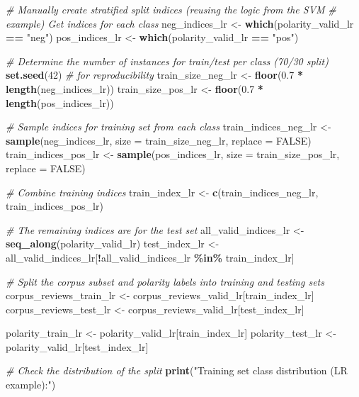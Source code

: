 \documentclass[
]{book}
\newenvironment{Shaded}{\begin{snugshade}}{\end{snugshade}}
\newcommand{\AttributeTok}[1]{\textcolor[rgb]{0.13,0.29,0.53}{#1}}
\newcommand{\CommentTok}[1]{\textcolor[rgb]{0.56,0.35,0.01}{\textit{#1}}}
\newcommand{\ConstantTok}[1]{\textcolor[rgb]{0.56,0.35,0.01}{#1}}
\newcommand{\DecValTok}[1]{\textcolor[rgb]{0.00,0.00,0.81}{#1}}
\newcommand{\FloatTok}[1]{\textcolor[rgb]{0.00,0.00,0.81}{#1}}
\newcommand{\FunctionTok}[1]{\textcolor[rgb]{0.13,0.29,0.53}{\textbf{#1}}}
\newcommand{\NormalTok}[1]{#1}
\newcommand{\OtherTok}[1]{\textcolor[rgb]{0.56,0.35,0.01}{#1}}
\newcommand{\SpecialCharTok}[1]{\textcolor[rgb]{0.81,0.36,0.00}{\textbf{#1}}}
\newcommand{\StringTok}[1]{\textcolor[rgb]{0.31,0.60,0.02}{#1}}
\begin{document}
\begin{Shaded}
\begin{Highlighting}[]
\CommentTok{\# Manually create stratified split indices (reusing the logic from the SVM}
\CommentTok{\# example) Get indices for each class}
\NormalTok{neg\_indices\_lr }\OtherTok{\textless{}{-}} \FunctionTok{which}\NormalTok{(polarity\_valid\_lr }\SpecialCharTok{==} \StringTok{"neg"}\NormalTok{)}
\NormalTok{pos\_indices\_lr }\OtherTok{\textless{}{-}} \FunctionTok{which}\NormalTok{(polarity\_valid\_lr }\SpecialCharTok{==} \StringTok{"pos"}\NormalTok{)}

\CommentTok{\# Determine the number of instances for train/test per class (70/30 split)}
\FunctionTok{set.seed}\NormalTok{(}\DecValTok{42}\NormalTok{)  }\CommentTok{\# for reproducibility}
\NormalTok{train\_size\_neg\_lr }\OtherTok{\textless{}{-}} \FunctionTok{floor}\NormalTok{(}\FloatTok{0.7} \SpecialCharTok{*} \FunctionTok{length}\NormalTok{(neg\_indices\_lr))}
\NormalTok{train\_size\_pos\_lr }\OtherTok{\textless{}{-}} \FunctionTok{floor}\NormalTok{(}\FloatTok{0.7} \SpecialCharTok{*} \FunctionTok{length}\NormalTok{(pos\_indices\_lr))}

\CommentTok{\# Sample indices for training set from each class}
\NormalTok{train\_indices\_neg\_lr }\OtherTok{\textless{}{-}} \FunctionTok{sample}\NormalTok{(neg\_indices\_lr, }\AttributeTok{size =}\NormalTok{ train\_size\_neg\_lr, }\AttributeTok{replace =} \ConstantTok{FALSE}\NormalTok{)}
\NormalTok{train\_indices\_pos\_lr }\OtherTok{\textless{}{-}} \FunctionTok{sample}\NormalTok{(pos\_indices\_lr, }\AttributeTok{size =}\NormalTok{ train\_size\_pos\_lr, }\AttributeTok{replace =} \ConstantTok{FALSE}\NormalTok{)}

\CommentTok{\# Combine training indices}
\NormalTok{train\_index\_lr }\OtherTok{\textless{}{-}} \FunctionTok{c}\NormalTok{(train\_indices\_neg\_lr, train\_indices\_pos\_lr)}

\CommentTok{\# The remaining indices are for the test set}
\NormalTok{all\_valid\_indices\_lr }\OtherTok{\textless{}{-}} \FunctionTok{seq\_along}\NormalTok{(polarity\_valid\_lr)}
\NormalTok{test\_index\_lr }\OtherTok{\textless{}{-}}\NormalTok{ all\_valid\_indices\_lr[}\SpecialCharTok{!}\NormalTok{all\_valid\_indices\_lr }\SpecialCharTok{\%in\%}\NormalTok{ train\_index\_lr]}

\CommentTok{\# Split the corpus subset and polarity labels into training and testing sets}
\NormalTok{corpus\_reviews\_train\_lr }\OtherTok{\textless{}{-}}\NormalTok{ corpus\_reviews\_valid\_lr[train\_index\_lr]}
\NormalTok{corpus\_reviews\_test\_lr }\OtherTok{\textless{}{-}}\NormalTok{ corpus\_reviews\_valid\_lr[test\_index\_lr]}

\NormalTok{polarity\_train\_lr }\OtherTok{\textless{}{-}}\NormalTok{ polarity\_valid\_lr[train\_index\_lr]}
\NormalTok{polarity\_test\_lr }\OtherTok{\textless{}{-}}\NormalTok{ polarity\_valid\_lr[test\_index\_lr]}

\CommentTok{\# Check the distribution of the split}
\FunctionTok{print}\NormalTok{(}\StringTok{"Training set class distribution (LR example):"}\NormalTok{)}
\end{Highlighting}
\end{Shaded}
\end{document}
